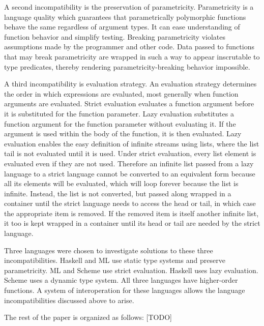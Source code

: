 A second incompatibility is the preservation of parametricity.  Parametricity is a language quality which guarantees that parametrically polymorphic functions behave the same regardless of argument types.  It can ease understanding of function behavior and simplify testing.  Breaking parametricity violates assumptions made by the programmer and other code.  Data passed to functions that may break parametricity are wrapped in such a way to appear inscrutable to type predicates, thereby rendering parametricity-breaking behavior impossible.

A third incompatibility is evaluation strategy.  An evaluation strategy determines the order in which expressions are evaluated, most generally when function arguments are evaluated.  Strict evaluation evaluates a function argument before it is substituted for the function parameter.  Lazy evaluation substitutes a function argument for the function parameter without evaluating it.  If the argument is used within the body of the function, it is then evaluated.  Lazy evaluation enables the easy definition of infinite streams using lists, where the list tail is not evaluated until it is used.  Under strict evaluation, every list element is evaluated even if they are not used.  Therefore an infinite list passed from a lazy language to a strict language cannot be converted to an equivalent form because all its elements will be evaluated, which will loop forever because the list is infinite.  Instead, the list is not converted, but passed along wrapped in a container until the strict language needs to access the head or tail, in which case the appropriate item is removed.  If the removed item is itself another infinite list, it too is kept wrapped in a container until its head or tail are needed by the strict language.

Three languages were chosen to investigate solutions to these three incompatibilities.  Haskell and ML use static type systems and preserve parametricity.  ML and Scheme use strict evaluation.  Haskell uses lazy evaluation.  Scheme uses a dynamic type system.  All three languages have higher-order functions.  A system of interoperation for these languages allows the language incompatibilities discussed above to arise.  

The rest of the paper is organized as follows: [TODO]